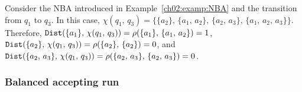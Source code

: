 \begin{example}\label{ch03:examp:dist}
Consider the NBA introduced in Example~\ref{ch02:examp:NBA} and the transition from $q_1$
to $q_3$. In this case,
$\chi(q_1,\, q_3)
= \{\{a_2\},\, \{a_1,\, a_2\},\, \{a_2,\, a_3\},\,
\{a_1,\, a_2,\, a_3\}\}$. Therefore,
$\textup{\texttt{Dist}}(\{a_1\},\, \chi(q_1,\, q_3))
= \rho(\{a_1\},\, \{a_1,\, a_2\}) = 1$,
$\textup{\texttt{Dist}}(\{a_2\},\, \chi(q_1,\, q_3))
= \rho(\{a_2\},\, \{a_2\}) = 0$, and
$\textup{\texttt{Dist}}(\{a_2,\, a_3\},\, \chi(q_1,\, q_3))
= \rho(\{a_2,\, a_3\},\, \{a_2,\, a_3\}) = 0$.
\end{example}

\subsubsection{Balanced accepting run}\label{ch03:subsec:probStatement}

